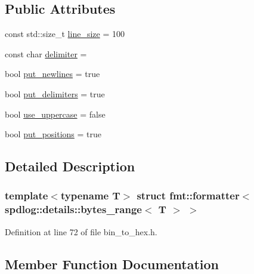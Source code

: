\subsection*{Public Attributes}
\begin{DoxyCompactItemize}
\item 
const std\+::size\+\_\+t \hyperlink{structfmt_1_1formatter_3_01spdlog_1_1details_1_1bytes__range_3_01_t_01_4_01_4_aae6b62746bc315b2927199438ba2f87a}{line\+\_\+size} = 100
\item 
const char \hyperlink{structfmt_1_1formatter_3_01spdlog_1_1details_1_1bytes__range_3_01_t_01_4_01_4_ae269e1463930629ea37d0d93d0d726c5}{delimiter} = \textquotesingle{} \textquotesingle{}
\item 
bool \hyperlink{structfmt_1_1formatter_3_01spdlog_1_1details_1_1bytes__range_3_01_t_01_4_01_4_a6f28abac88c19077023abaadd2d3315f}{put\+\_\+newlines} = true
\item 
bool \hyperlink{structfmt_1_1formatter_3_01spdlog_1_1details_1_1bytes__range_3_01_t_01_4_01_4_aec694b471eae3bc7d0a1d4487579721c}{put\+\_\+delimiters} = true
\item 
bool \hyperlink{structfmt_1_1formatter_3_01spdlog_1_1details_1_1bytes__range_3_01_t_01_4_01_4_a0974264e6edcc83c7c191f34d2ce4781}{use\+\_\+uppercase} = false
\item 
bool \hyperlink{structfmt_1_1formatter_3_01spdlog_1_1details_1_1bytes__range_3_01_t_01_4_01_4_a0997eb476f830eb211f3d17777079d7d}{put\+\_\+positions} = true
\end{DoxyCompactItemize}


\subsection{Detailed Description}
\subsubsection*{template$<$typename T$>$\newline
struct fmt\+::formatter$<$ spdlog\+::details\+::bytes\+\_\+range$<$ T $>$ $>$}



Definition at line 72 of file bin\+\_\+to\+\_\+hex.\+h.



\subsection{Member Function Documentation}
\mbox{\label{structfmt_1_1formatter_3_01spdlog_1_1details_1_1bytes__range_3_01_t_01_4_01_4_a23665231993cdeb323a86ecb9a7a63a1}} 

